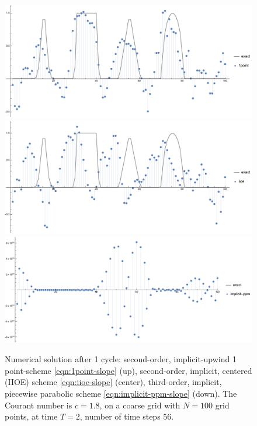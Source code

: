 \documentclass[../thesis.tex]{subfiles}
\begin{document}
\begin{figure}[H]
	\centering
	\includegraphics[width=\textwidth]{fig-1point-c1p8-T2-limit0-shu.pdf}
	\includegraphics[width=\textwidth]{fig-iioe-c1p8-T2-limit0-shu.pdf}
	\includegraphics[width=\textwidth]{fig-implicit-ppm-c1p8-T2-limit0-shu.pdf}
	\caption{Numerical solution after 1 cycle: second-order, implicit-upwind 1 point-scheme \eqref{eqn:1point-slope} (up), second-order, implicit, centered (IIOE) scheme \eqref{eqn:iioe-slope} (center), third-order, implicit, piecewise parabolic scheme \eqref{eqn:implicit-ppm-slope} (down). The Courant number is \(c = 1.8\), on a coarse grid with \(N = 100\) grid points, at time \(T = 2\), number of time steps 56.}
	\label{fig:c1p8-T2-limit0-shu}
\end{figure}
\end{document}
